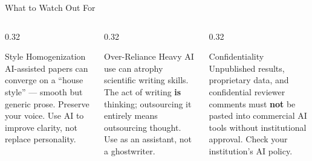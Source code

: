 \begin{frame}{What to Watch Out For}
  \begin{columns}[T, onlytextwidth]
    \begin{column}{0.32\textwidth}
      \begin{alertblock}{Style Homogenization}
        AI-assisted papers can converge on a ``house style'' — smooth but generic prose. Preserve your voice. Use AI to improve clarity, not replace personality.
      \end{alertblock}
    \end{column}
    \hfill
    \begin{column}{0.32\textwidth}
      \begin{alertblock}{Over-Reliance}
        Heavy AI use can atrophy scientific writing skills. The act of writing \textbf{is} thinking; outsourcing it entirely means outsourcing thought. Use as an assistant, not a ghostwriter.
      \end{alertblock}
    \end{column}
    \hfill
    \begin{column}{0.32\textwidth}
      \begin{alertblock}{Confidentiality}
        Unpublished results, proprietary data, and confidential reviewer comments must \textbf{not} be pasted into commercial AI tools without institutional approval. Check your institution's AI policy.
      \end{alertblock}
    \end{column}
  \end{columns}
\end{frame}
